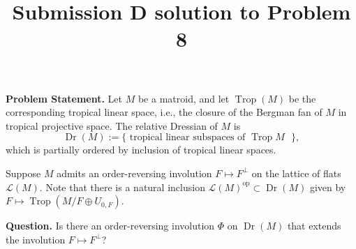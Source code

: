 \documentclass[12pt]{article}
\DeclareMathOperator{\Trop}{Trop}
\DeclareMathOperator{\Dr}{Dr}
\newcommand{\cLL}{\mathcal{L}}
\newcommand{\op}{\mathrm{op}}
\begin{document}
\title{Submission D solution to Problem 8}
\date{}
\maketitle


\noindent \textbf{Problem Statement.} Let $M$ be a matroid, and let $\Trop(M)$ be the corresponding tropical linear space, i.e., the closure of the Bergman fan of $M$ in tropical projective space. The relative Dressian of $M$ is 
\[ \Dr(M) :=\{\text{ tropical linear subspaces of $\Trop M$ }\}, \]
which is partially ordered by inclusion of tropical linear spaces. 

Suppose $M$ admits an order-reversing involution $F\mapsto F^\perp$ on the lattice of flats $\cLL(M)$. Note that there is a natural inclusion $\cLL(M)^{\op} \subset \Dr(M)$ given by $F\mapsto \Trop(M/F\oplus U_{0,F})$.

\medskip
\noindent \textbf{Question.} Is there an order-reversing involution $\Phi$ on $\Dr(M)$ that extends the involution $F\mapsto F^\perp$?

\bigskip
\end{document}
